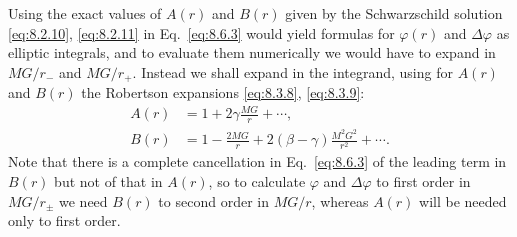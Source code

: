 Using the exact values of \(A(r)\) and \(B(r)\) given by the Schwarzschild
solution \eqref{eq:8.2.10}, \eqref{eq:8.2.11} in
Eq.~\eqref{eq:8.6.3} would yield formulas for \(\varphi(r)\) and
\(\Delta\varphi\) as elliptic integrals, and to evaluate them numerically
we would have to expand in \(MG/r_-\) and \(MG/r_+\). Instead we shall
expand in the integrand, using for \(A(r)\) and \(B(r)\) the Robertson
expansions \eqref{eq:8.3.8}, \eqref{eq:8.3.9}:
\begin{equation}
  \begin{aligned}
  A(r)&=1+2\gamma\frac{MG}{r}+\cdots,\\
  B(r)&=1-\frac{2MG}{r}
  +2(\beta-\gamma)\frac{M^2G^2}{r^2}+\cdots.
  \end{aligned}
  \tag{8.6.5}\label{eq:8.6.5}
\end{equation}
Note that there is a complete cancellation in Eq.~\eqref{eq:8.6.3} of
the leading term in \(B(r)\) but not of that in \(A(r)\), so to calculate
\(\varphi\) and \(\Delta\varphi\) to first order in \(MG/r_\pm\) we need
\(B(r)\) to second order in \(MG/r\), whereas \(A(r)\) will be needed only
to first order.

